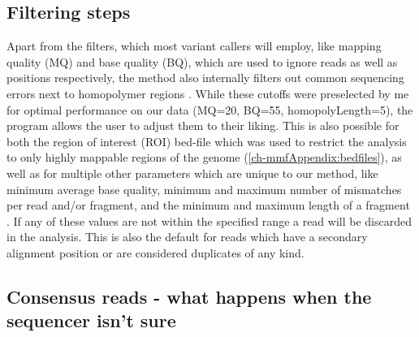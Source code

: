 \subsection{Filtering steps}
Apart from the filters, which most variant callers will employ, like mapping quality (MQ) and base quality (BQ), which are used to ignore reads as well as positions respectively, the method also internally filters out common sequencing errors next to homopolymer regions \cite{Heydari2019}. While these cutoffs were preselected by me for optimal performance on our data (MQ=20, BQ=55, homopolyLength=5), the program allows the user to adjust them to their liking.
This is also possible for both the region of interest (ROI) bed-file which was used to restrict the analysis to only highly mappable regions of the genome (\autoref{ch-mmfAppendix:bedfiles}), as well as for multiple other parameters which are unique to our method, like minimum average base quality, minimum and maximum number of mismatches per read and/or fragment, and the minimum and maximum length of a fragment \cite{Hudecova2021} . If any of these values are not within the specified range a read will be discarded in the analysis. This is also the default for reads which have a secondary alignment position or are considered duplicates of any kind.

\subsection[Consensus reads]{Consensus reads - what happens when the sequencer isn't sure}
\label{mmf-sec:consensus}

